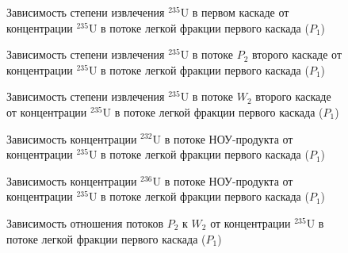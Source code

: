 \begin{figure}[ht]
    \centering
      
    \caption{Зависимость степени извлечения $^{235}$U в первом каскаде от концентрации $^{235}$U в потоке легкой фракции первого каскада ($P_1$)}\label{ex1P1}
\end{figure}

\begin{figure}[ht]
    \centering
    \begin{minipage}{.5\textwidth}
        \centering
        
  \caption{{Зависимость степени извлечения $^{235}$U в потоке $P_2$ второго каскаде от концентрации $^{235}$U в потоке легкой фракции первого каскада ($P_1$){\label{EX_P2}}}}
  \end{minipage}%
    \begin{minipage}{.5\textwidth}
      \centering
      
\caption{{Зависимость степени извлечения $^{235}$U в потоке $W_2$ второго каскаде от концентрации $^{235}$U в потоке легкой фракции первого каскада ($P_1$){\label{EX_W2}}}}
    \end{minipage}
\end{figure}

\begin{figure}[ht]
  \centering
  \begin{minipage}{.5\textwidth}
    \centering
    
    \caption{{Зависимость концентрации $^{232}$U в потоке НОУ-продукта от концентрации $^{235}$U в потоке легкой фракции первого каскада ($P_1$){\label{C232P}}}}
  \end{minipage}%
  \begin{minipage}{.5\textwidth}
    \centering
    
    \caption{{Зависимость концентрации $^{236}$U в потоке НОУ-продукта от концентрации $^{235}$U в потоке легкой фракции первого каскада ($P_1$){\label{C236P}}}}
\end{minipage}
\end{figure}

\begin{figure}[ht]
    \centering
      
    \caption{Зависимость отношения потоков $P_2$ к $W_2$ от концентрации $^{235}$U в потоке легкой фракции первого каскада ($P_1$)}\label{P2W2}
\end{figure}

